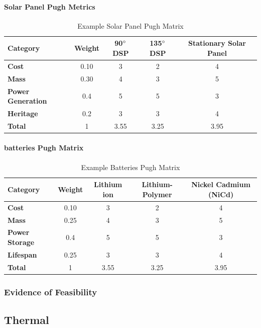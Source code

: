 \paragraph{Solar Panel Pugh Metrics}
\begin{table}[H]
\centering
\begin{tabular}{|l|c|c|c|c|} 
\hline
    \textbf{Category} & \textbf{Weight} & \textbf{90$\degree$ DSP} & \textbf{135$\degree$ DSP} & \textbf{Stationary Solar Panel}
    \\
\hline
    \textbf{Cost} & 0.10 & 3 & 2 & 4
    \\
\hline
    \textbf{Mass} & 0.30 & 4 & 3 & 5
    \\
\hline
    \textbf{Power Generation} & 0.4 & 5 & 5 & 3
    \\
\hline
    \textbf{Heritage} & 0.2 & 3 & 3 & 4
    \\
\hline
    \textbf{Total} & 1 & 3.55 & 3.25 & 3.95
    \\
\hline
\end{tabular}
\caption{Example Solar Panel Pugh Matrix }
\label{tbl:SolarPanel_Pugh}
\end{table}
\paragraph{batteries Pugh Matrix}
\begin{table}[H]
\centering
\begin{tabular}{|l|c|c|c|c|} 
\hline
    \textbf{Category} & \textbf{Weight} & \textbf{Lithium ion} & \textbf{Lithium-Polymer} & \textbf{Nickel Cadmium (NiCd)}
    \\
\hline
    \textbf{Cost} & 0.10 & 3 & 2 & 4
    \\
\hline
    \textbf{Mass} & 0.25 & 4 & 3 & 5
    \\
\hline
    \textbf{Power Storage} & 0.4 & 5 & 5 & 3
    \\
\hline
    \textbf{Lifespan} & 0.25 & 3 & 3 & 4
    \\
\hline
    \textbf{Total} & 1 & 3.55 & 3.25 & 3.95
    \\
\hline
\end{tabular}
\caption{Example Batteries Pugh Matrix }
\label{tbl:Batteries_Pugh}
\end{table}
\subsubsection{Evidence of Feasibility}
\subsection{Thermal}
